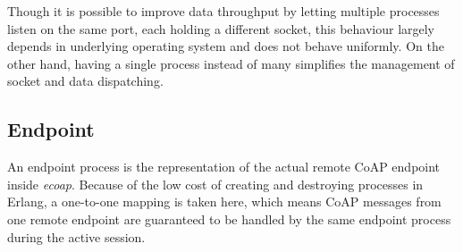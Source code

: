 Though it is possible to improve data throughput by letting multiple processes listen on the same port, each holding a different socket, this behaviour largely depends in underlying operating system and does not behave uniformly. On the other hand, having a single process instead of many simplifies the management of socket and data dispatching.

\subsection{Endpoint}\label{coap_endpoint}

An endpoint process is the representation of the actual remote CoAP endpoint inside \textit{ecoap}. Because of the low cost of creating and destroying processes in Erlang, a one-to-one mapping is taken here, which means CoAP messages from one remote endpoint are guaranteed to be handled by the same endpoint process during the active session.

\begin{figure}
\label{fig:coap_endpoint}
\end{figure}

